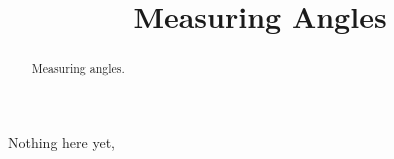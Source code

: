 \documentclass{ximera}
\title{Measuring Angles}
\begin{document}
\begin{abstract}
Measuring angles.
\end{abstract}
\maketitle

Nothing here yet,
\end{document}

